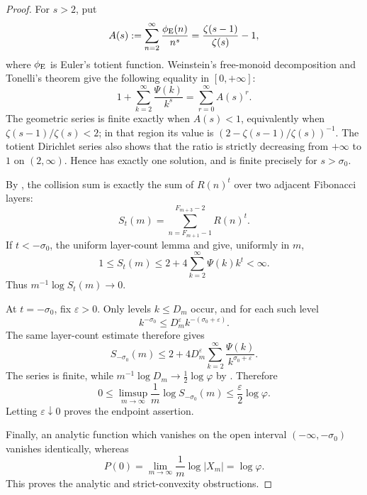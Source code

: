 \begin{proof}
For \(s>2\), put
\[
 A(s):=\sum_{n=2}^{\infty}\frac{\phi_{\rm E}(n)}{n^s}
 =\frac{\zeta(s-1)}{\zeta(s)}-1,
\]
where \(\phi_{\rm E}\) is Euler's totient function.  Weinstein's free-monoid
decomposition and Tonelli's theorem give the following equality in
\([0,+\infty]\):
\begin{equation}
 1+\sum_{k=2}^{\infty}\frac{\Psi(k)}{k^s}
 =\sum_{r=0}^{\infty}A(s)^r.
 \label{eq:weinstein-level-dirichlet-series}
\end{equation}
The geometric series is finite exactly when \(A(s)<1\), equivalently when
\(\zeta(s-1)/\zeta(s)<2\); in that region its value is
\((2-\zeta(s-1)/\zeta(s))^{-1}\).  The totient Dirichlet series also shows
that the ratio is strictly decreasing from \(+\infty\) to \(1\) on
\((2,\infty)\).  Hence  has exactly one solution,
and  is finite precisely for
\(s>\sigma_0\).

By , the collision sum is exactly the sum
of \(R(n)^t\) over two adjacent Fibonacci layers:
\begin{equation}
 S_t(m)=\sum_{n=F_{m+1}-1}^{F_{m+3}-2}R(n)^t.
 \label{eq:real-collision-two-layers}
\end{equation}
If \(t<-\sigma_0\), the uniform layer-count lemma and
 give, uniformly in \(m\),
\[
 1\le S_t(m)
 \le 2+4\sum_{k=2}^{\infty}\Psi(k)k^t<\infty.
\]
Thus \(m^{-1}\log S_t(m)\to0\).

At \(t=-\sigma_0\), fix \(\varepsilon>0\).  Only levels \(k\le D_m\)
occur, and for each such level
\[
 k^{-\sigma_0}\le D_m^\varepsilon k^{-(\sigma_0+\varepsilon)}.
\]
The same layer-count estimate therefore gives
\[
 S_{-\sigma_0}(m)
 \le 2+4D_m^{\varepsilon}
       \sum_{k=2}^{\infty}\frac{\Psi(k)}{k^{\sigma_0+\varepsilon}}.
\]
The series is finite, while
\(m^{-1}\log D_m\to\frac12\log\varphi\) by
.  Therefore
\[
 0\le\limsup_{m\to\infty}\frac1m\log S_{-\sigma_0}(m)
 \le\frac{\varepsilon}{2}\log\varphi.
\]
Letting \(\varepsilon\downarrow0\) proves the endpoint assertion.

Finally, an analytic function which vanishes on the open interval
\(( -\infty,-\sigma_0)\) vanishes identically, whereas
\[
 P(0)=\lim_{m\to\infty}\frac1m\log|X_m|=\log\varphi.
\]
This proves the analytic and strict-convexity obstructions.
\end{proof}

